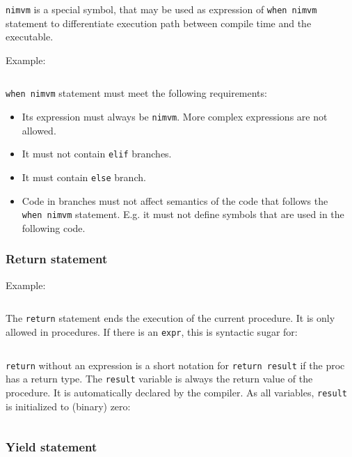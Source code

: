 \texttt{nimvm} is a special symbol, that may be used as expression of
\texttt{when\ nimvm} statement to differentiate execution path between
compile time and the executable.

Example:

\begin{verbatim}
\end{verbatim}

\texttt{when\ nimvm} statement must meet the following requirements:

\begin{itemize}
\tightlist
\item
  Its expression must always be \texttt{nimvm}. More complex expressions
  are not allowed.
\item
  It must not contain \texttt{elif} branches.
\item
  It must contain \texttt{else} branch.
\item
  Code in branches must not affect semantics of the code that follows
  the \texttt{when\ nimvm} statement. E.g. it must not define symbols
  that are used in the following code.
\end{itemize}

\hypertarget{return-statement}{%
\subsubsection{Return statement}\label{return-statement}}

Example:

\begin{verbatim}
\end{verbatim}

The \texttt{return} statement ends the execution of the current
procedure. It is only allowed in procedures. If there is an
\texttt{expr}, this is syntactic sugar for:

\begin{verbatim}
\end{verbatim}

\texttt{return} without an expression is a short notation for
\texttt{return\ result} if the proc has a return type. The
\texttt{result} variable is always the return value of the procedure. It
is automatically declared by the compiler. As all variables,
\texttt{result} is initialized to (binary) zero:

\begin{verbatim}
\end{verbatim}

\hypertarget{yield-statement}{%
\subsubsection{Yield statement}\label{yield-statement}}

